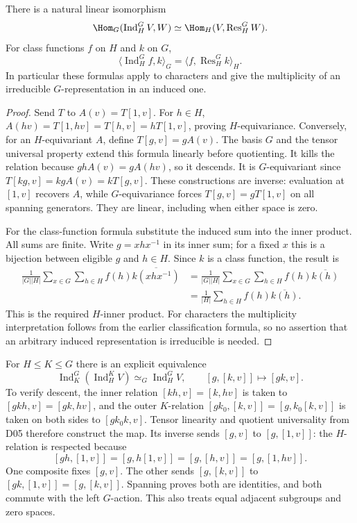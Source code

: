 \begin{theorem}\label{thm:frobenius-reciprocity}
There is a natural linear isomorphism
\[
 \Hom_G(\operatorname{Ind}_H^G V,W)
 \simeq\Hom_H(V,\operatorname{Res}_H^G W).
\]
For class functions $f$ on $H$ and $k$ on $G$,
\[
 \langle\operatorname{Ind}_H^G f,k\rangle_G
   =\langle f,\operatorname{Res}_H^G k\rangle_H.
\]
In particular these formulas apply to characters and give the
multiplicity of an irreducible $G$-representation in an induced one.
\end{theorem}
\begin{proof}
Send $T$ to $A(v)=T[1,v]$. For $h\in H$,
$A(hv)=T[1,hv]=T[h,v]=hT[1,v]$, proving $H$-equivariance.
Conversely, for an $H$-equivariant $A$, define
$T[g,v]=gA(v)$. The basis $G$ and the tensor universal property
extend this formula linearly before quotienting. It kills the relation
because $ghA(v)=gA(hv)$, so it descends. It is $G$-equivariant since
$T[k g,v]=kgA(v)=kT[g,v]$. These constructions are inverse:
evaluation at $[1,v]$ recovers $A$, while $G$-equivariance forces
$T[g,v]=gT[1,v]$ on all spanning generators. They are linear,
including when either space is zero.

For the class-function formula substitute the induced sum into the
inner product. All sums are finite. Write $g=xhx^{-1}$ in its inner
sum; for a fixed $x$ this is a bijection between eligible $g$ and
$h\in H$. Since $k$ is a class function, the result is
\[
 \begin{aligned}
 \frac1{|G||H|}\sum_{x\in G}\sum_{h\in H}
       f(h)\overline{k(xhx^{-1})}
 &=\frac1{|G||H|}\sum_{x\in G}\sum_{h\in H}
       f(h)\overline{k(h)}\\
 &=\frac1{|H|}\sum_{h\in H}f(h)\overline{k(h)}.
 \end{aligned}
\]
This is the required $H$-inner product. For characters the multiplicity
interpretation follows from the earlier classification formula, so no
assertion that an arbitrary induced representation is irreducible is
needed.
\end{proof}

For $H\leq K\leq G$ there is an explicit equivalence
\[
 \operatorname{Ind}_K^G(\operatorname{Ind}_H^K V)
 \simeq_G\operatorname{Ind}_H^G V,
 \qquad [g,[k,v]]\longmapsto[gk,v].
\]
To verify descent, the inner relation $[kh,v]=[k,hv]$ is taken to
$[gkh,v]=[gk,hv]$, and the outer $K$-relation
$[gk_0,[k,v]]=[g,k_0[k,v]]$ is taken on both sides to
$[gk_0k,v]$. Tensor linearity and quotient universality from D05
therefore construct the map. Its inverse sends $[g,v]$ to
$[g,[1,v]]$: the $H$-relation is respected because
\[
 [gh,[1,v]]=[g,h[1,v]]=[g,[h,v]]=[g,[1,hv]].
\]
One composite fixes $[g,v]$. The other sends $[g,[k,v]]$ to
$[gk,[1,v]]=[g,[k,v]]$. Spanning proves both are identities,
and both commute with the left $G$-action. This also treats equal
adjacent subgroups and zero spaces.

